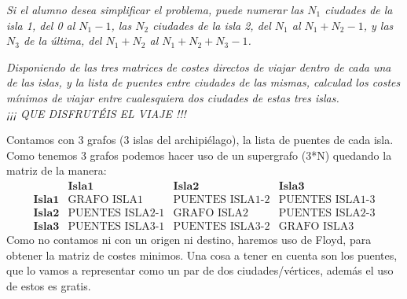 \textit{Si el alumno desea simplificar el problema, puede numerar las \(N_1\) ciudades de la isla 1, del 0 al \(N_{1}-1\), las \(N_2\) ciudades de la isla 2, del \(N_1\) al \(N_1+N_2-1\), y las \(N_3\) de la última, del \(N_1+N_2\) al \(N_1+N_2+N_3-1\).}

\textit{Disponiendo de las tres matrices de costes directos de viajar dentro de cada una de las islas, y la lista de puentes entre ciudades de las mismas, calculad los costes mínimos de viajar entre cualesquiera dos ciudades de estas tres islas.\\¡¡¡ QUE DISFRUTÉIS EL VIAJE !!!}

Contamos con 3 grafos (3 islas del archipiélago), la lista de puentes de cada isla. Como tenemos 3 grafos podemos hacer uso de un supergrafo (3*N) quedando la matriz de la manera:
\[
\begin{array}{c|c|c|c}
                & \textbf{Isla1}          & \textbf{Isla2}            & \textbf{Isla3}  \\
      \hline
\textbf{Isla1}  & \text{GRAFO ISLA1}      & \text{PUENTES ISLA1-2}    & \text{PUENTES ISLA1-3}\\
      \hline
\textbf{Isla2}  & \text{PUENTES ISLA2-1}  & \text{GRAFO ISLA2}      & \text{PUENTES ISLA2-3} \\
      \hline
\textbf{Isla3}  & \text{PUENTES ISLA3-1}  & \text{PUENTES ISLA3-2}     & \text{GRAFO ISLA3}
\end{array}
\]
Como no contamos ni con un origen ni destino, haremos uso de Floyd, para obtener la matriz de costes minimos.
Una cosa a tener en cuenta son los puentes, que lo vamos a representar como un par de dos ciudades/vértices, además el uso de estos es gratis.
